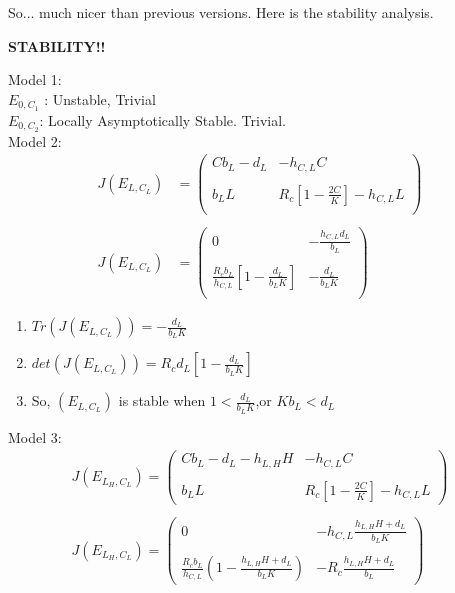 \documentclass[11pt]{article}
\begin{document}
{\parindent0pt
\vspace{.5in}
So... much nicer than previous versions. Here is the stability analysis.

\begin{center}
\textbf{STABILITY!!}
\end{center}

Model 1: \\
$E_{0, C_{1}}$ : Unstable, Trivial \\
$E_{0, C_{2}}$: Locally Asymptotically Stable. Trivial. \\

Model 2: 
\begin{align*}
J(E_{L, C_{L}} ) &= \begin{pmatrix} Cb_{L} - d_{L} & - h_{C,L}C \\ & \\  b_{L}L &R_{c}\left[ 1 - \frac{2C}{K} \right] - h_{C,L} L \\ \end{pmatrix}\\ 
\\
J(E_{L, C_{L}} ) &= \begin{pmatrix} 0 & - \frac{h_{C,L}d_{L}}{b_{L}} \\ & \\ \frac{R_{c}b_{L}}{h_{C,L}} \left[ 1 - \frac{d_{L}}{b_{L}K} \right] & -\frac{d_{L}}{b_{L}K} \\
\end{pmatrix}
\end{align*}


\begin{enumerate}
\item $Tr(J(E_{L, C_{L}} ) ) = -\frac{d_{L}}{b_{L}K} $\\

\item$det(J(E_{L, C_{L}} ) ) =   R_{c}d_{L}\left[ 1 - \frac{d_{L}}{b_{L}K}\right] $\\

\item So, $(E_{L, C_{L}} )$ is stable when $ 1 < \frac{d_{L}}{b_{L}K}$,or  $Kb_{L} < d_{L}$ \\
\end{enumerate}

\vspace{.5in}
Model 3: 
\begin{align*}
J(E_{L_{H}, C_{L}}  ) = \begin{pmatrix} Cb_{L} - d_{L} - h_{L,H}H & - h_{C,L} C\\
						 & \\
						b_{L}L & R_{c}\left[1 - \frac{2C}{K} \right] - h_{C,L}L  \end{pmatrix}\\
\\
J(E_{L_{H}, C_{L}}  ) = \begin{pmatrix} 0 & - h_{C,L}\frac{h_{L,H}H + d_{L}}{b_{L}K}\\
						 & \\
						\frac{R_{c}b_{L}}{h_{C,L}}\left( 1 - \frac{h_{L,H}H +d_{L}}{b_{L}K}\right) & -R_{c}\frac{h_{L,H}H +d_{L}}{b_{L}}  \end{pmatrix}\\
\end{align*}


}
\end{document}
